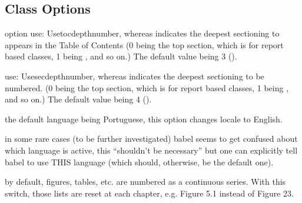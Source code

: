 \documentclass[article,nogeometry,english,tocdepth=3,secdepth=3]{ufrgscca} %
\begin{document}
\subsection{Class Options}
\begin{describelist}{option}
	 { use: \tsobj[key]Use{tocdepth}{number}, whereas  indicates the deepest sectioning to appears in the Table of Contents (0 being the top section, which is \tsmacro{\chapter}{} for report based classes, 1 being \tsmacro{\section}{}, and so on.) The default value being 3 (\tsmacro{\subsubsection}{}).}

	 { use: \tsobj[key]Use{secdepth}{number}, whereas  indicates the deepest sectioning to be numbered. (0 being the top section, which is \tsmacro{\chapter}{} for report based classes, 1 being \tsmacro{\section}{}, and so on.) The default value being 4 (\tsmacro{\paragraph}{}).}

	 { the default language being Portuguese, this option changes locale to English.}

	 { in some rare cases (to be further investigated) babel seems to get confused about which language is active, this “shouldn't be necessary” but one can explicitly tell babel to use THIS language (which should, otherwise, be the default one).}

	 { by default, figures, tables, etc. are numbered as a continuous series. With this switch, those lists are reset at each chapter, e.g. Figure 5.1 instead of Figure 23.}


\end{describelist}
\end{document}
